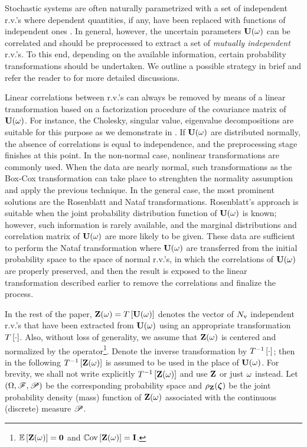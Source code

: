 Stochastic systems are often naturally parametrized with a set of independent r.v.'s where dependent quantities, if any, have been replaced with functions of independent ones \cite{xiu2009}. In general, however, the uncertain parameters $\mathbf{U}(\omega)$ can be correlated and should be preprocessed to extract a set of \emph{mutually independent} r.v.'s. To this end, depending on the available information, certain probability transformations should be undertaken. We outline a possible strategy in brief and refer the reader to \cite{eldred2009, xiu2009} for more detailed discussions.

Linear correlations between r.v.'s can always be removed by means of a linear transformation based on a factorization procedure of the covariance matrix of $\mathbf{U}(\omega)$. For instance, the Cholesky, singular value, eigenvalue decompositions \cite{press2007} are suitable for this purpose as we demonstrate in . If $\mathbf{U}(\omega)$ are distributed normally, the absence of correlations is equal to independence, and the preprocessing stage finishes at this point. In the non-normal case, nonlinear transformations are commonly used. When the data are nearly normal, such transformations as the Box-Cox transformation \cite{box1964} can take place to strenghten the normality assumption and apply the previous technique. In the general case, the most prominent solutions are the Rosenblatt \cite{rosenblatt1952} and Nataf \cite{hongshuang2008} transformations. Rosenblatt's approach is suitable when the joint probability distribution function of $\mathbf{U}(\omega)$ is known; however, such information is rarely available, and the marginal distributions and correlation matrix of $\mathbf{U}(\omega)$ are more likely to be given. These data are sufficient to perform the Nataf transformation where $\mathbf{U}(\omega)$ are transferred from the initial probability space to the space of normal r.v.'s, in which the correlations of $\mathbf{U}(\omega)$ are properly preserved, and then the result is exposed to the linear transformation described earlier to remove the correlations and finalize the process.

In the rest of the paper, $\mathbf{Z}(\omega) = T\left[\mathbf{U}(\omega)\right]$ denotes the vector of ${N_\text{v}}$ independent r.v.'s that have been extracted from $\mathbf{U}(\omega)$ using an appropriate transformation $T\left[\cdot\right]$. Also, without loss of generality, we assume that $\mathbf{Z}(\omega)$ is centered and normalized by the operator\footnote{$\oExp{\vZ(\o)} = \mZero$ and $\oCov{\vZ(\o)} = \mI$.}. Denote the inverse transformation by $T^{-1}\left[\cdot\right]$; then in the following $T^{-1}\left[\mathbf{Z}(\omega)\right]$ is assumed to be used in the place of $\mathbf{U}(\omega)$. For brevity, we shall not write explicitly $T^{-1}\left[\mathbf{Z}(\omega)\right]$ and use $\mathbf{Z}$ or just $\omega$ instead. Let $(\Omega, \mathscr{F}, \mathscr{P})$ be the corresponding probability space and $\rho_{\mathbf{Z}}(\boldsymbol{\zeta})$ be the joint probability density (mass) function of $\mathbf{Z}(\omega)$ associated with the continuous (discrete) measure $\mathscr{P}$.
